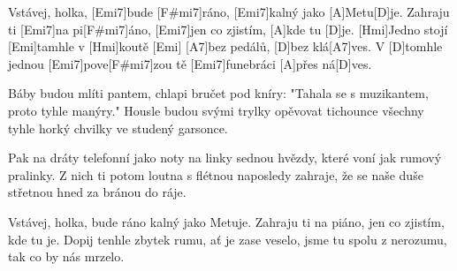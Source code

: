 
\sloka
[D]Vstávej, holka, [Emi7]bude [F#mi7]ráno,
[Emi7]kalný jako [A]Metu[D]je.
Zahraju ti [Emi7]na pi[F#mi7]áno,
[Emi7]jen co zjistím, [A]kde tu [D]je.
[Hmi]Jedno stojí [Emi]tamhle v [Hmi]koutě [Emi]
[A7]bez pedálů, [D]bez klá[A7]ves.
V [D]tomhle jednou [Emi7]pove[F#mi7]zou tě
[Emi7]funebráci [A]přes ná[D]ves.

\sloka
Báby budou mlíti pantem,
chlapi bručet pod kníry:
"Tahala se s muzikantem,
proto tyhle manýry."
Housle budou svými trylky
opěvovat tichounce
všechny tyhle horký chvilky
ve studený garsonce.

\sloka
Pak na dráty telefonní
jako noty na linky
sednou hvězdy, které voní
jak rumový pralinky.
Z nich ti potom loutna s flétnou
naposledy zahraje,
že se naše duše střetnou
hned za bránou do ráje.

\sloka
Vstávej, holka, bude ráno
kalný jako Metuje.
Zahraju ti na piáno,
jen co zjistím, kde tu je.
Dopij tenhle zbytek rumu,
ať je zase veselo,
jsme tu spolu z nerozumu,
tak co by nás mrzelo. 

